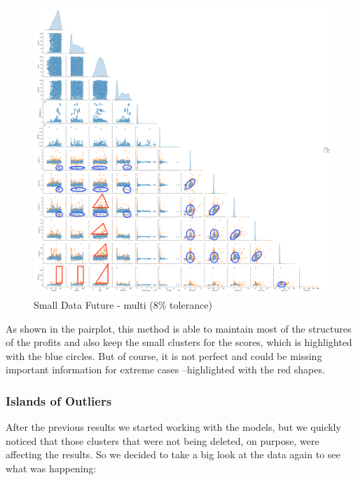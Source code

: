 \documentclass[11pt,english,a4paper,hidelinks]{book}
\begin{document}
\begin{figure}[H]
    \centering
    \includegraphics[width=1\textwidth]{images/code/outliers/Small Data future - Multi.png}
    \caption{Small Data Future - \acrshort{multi} (8\% tolerance)}
    \label{fig:small_data_future_multi}
\end{figure}

\noindent As shown in the \acrshort{pairplot}, this method is able to maintain most of the structures of the profits and also keep the small clusters for the scores, which is highlighted with the blue circles. But of course, it is not perfect and could be missing important information for extreme cases --highlighted with the red shapes. 


\subsubsection{Islands of Outliers}

\noindent After the previous results we started working with the models, but we quickly noticed that those clusters that were not being deleted, on purpose, were affecting the results. So we decided to take a big look at the data again to see what was happening:
\end{document}

